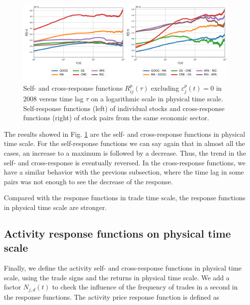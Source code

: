 \begin{figure}[htbp]
    \centering
    \includegraphics[width=\textwidth]
    {figures/03_responses_physical_scale_2008.png}
    \caption{Self- and cross-response functions $R^{p}_{ij}\left(\tau\right)$
             excluding $\varepsilon^{p}_{j}\left(t\right) = 0$ in 2008 versus
             time lag $\tau$ on a logarithmic scale in physical time scale.
             Self-response functions (left) of individual stocks and
             cross-response functions (right) of stock pairs from the same
             economic sector.}
    \label{fig:market_response_time_scale}
\end{figure}

The results showed in Fig. \ref{fig:market_response_time_scale} are the
self- and cross-response functions in physical time scale. For the
self-response functions we can say again that in almost all the cases, an
increase to a maximum is followed by a decrease. Thus, the trend in the self-
and cross-response is eventually reversed.
In the cross-response functions, we have a similar behavior with the previous
subsection, where the time lag in some pairs was not enough to see the decrease
of the response.

Compared with the response functions in trade time scale, the response functions
in physical time scale are stronger.

\subsection{Activity response functions on physical time scale}
\label{subsec:activity_response_function}

Finally, we define the activity self- and cross-response functions in physical
time scale, using the trade signs and the returns in physical time scale.
We add a factor $N_{j,d} \left(t \right)$ to check the influence of the
frequency of trades in a second in the response functions. The activity price
response function is defined as

